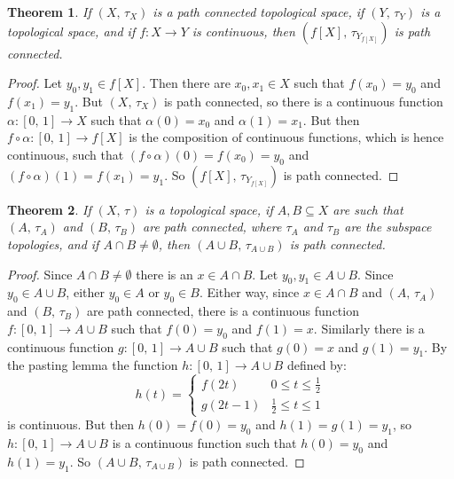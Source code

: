 \documentclass{article}
\theoremstyle{plain}
\newtheorem{theorem}{Theorem}[section]
\theoremstyle{normal}
\begin{document}
        \begin{theorem}
            If $(X,\,\tau_{X})$ is a path connected topological space,
            if $(Y,\,\tau_{Y})$ is a topological space, and if
            $f:X\rightarrow{Y}$ is continuous, then
            $(f[X],\,\tau_{Y_{f[X]}})$ is path connected.
        \end{theorem}
        \begin{proof}
            Let $y_{0},y_{1}\in{f}[X]$. Then there are
            $x_{0},x_{1}\in{X}$ such that $f(x_{0})=y_{0}$ and $f(x_{1})=y_{1}$.
            But $(X,\,\tau_{X})$ is path connected, so there is a continuous
            function $\alpha:[0,\,1]\rightarrow{X}$ such that
            $\alpha(0)=x_{0}$ and $\alpha(1)=x_{1}$. But then
            $f\circ\alpha:[0,\,1]\rightarrow{f}[X]$ is the composition of
            continuous functions, which is hence continuous, such that
            $(f\circ\alpha)(0)=f(x_{0})=y_{0}$ and
            $(f\circ\alpha)(1)=f(x_{1})=y_{1}$. So $(f[X],\,\tau_{Y_{f[X]}})$
            is path connected.
        \end{proof}
        \begin{theorem}
            If $(X,\,\tau)$ is a topological space, if
            $A,B\subseteq{X}$ are such that $(A,\,\tau_{A})$ and
            $(B,\,\tau_{B})$ are path connected, where $\tau_{A}$ and
            $\tau_{B}$ are the subspace topologies, and if
            $A\cap{B}\ne\emptyset$, then $(A\cup{B},\,\tau_{A\cup{B}})$ is
            path connected.
        \end{theorem}
        \begin{proof}
            Since $A\cap{B}\ne\emptyset$ there is an $x\in{A}\cap{B}$.
            Let $y_{0},y_{1}\in{A}\cup{B}$. Since $y_{0}\in{A}\cup{B}$, either
            $y_{0}\in{A}$ or $y_{0}\in{B}$. Either way, since $x\in{A}\cap{B}$
            and $(A,\,\tau_{A})$ and $(B,\,\tau_{B})$ are path connected,
            there is a continuous function $f:[0,\,1]\rightarrow{A}\cup{B}$
            such that $f(0)=y_{0}$ and $f(1)=x$. Similarly there is a
            continuous function $g:[0,\,1]\rightarrow{A}\cup{B}$ such that
            $g(0)=x$ and $g(1)=y_{1}$. By the pasting lemma the function
            $h:[0,\,1]\rightarrow{A}\cup{B}$ defined by:
            \begin{equation}
                h(t)=
                \begin{cases}
                    f(2t)&0\leq{t}\leq\frac{1}{2}\\
                    g(2t-1)&\frac{1}{2}\leq{t}\leq{1}
                \end{cases}
            \end{equation}
            is continuous. But then $h(0)=f(0)=y_{0}$ and $h(1)=g(1)=y_{1}$, so
            $h:[0,\,1]\rightarrow{A}\cup{B}$ is a continuous function such that
            $h(0)=y_{0}$ and $h(1)=y_{1}$. So
            $(A\cup{B},\,\tau_{A\cup{B}})$ is path connected.
        \end{proof}
\end{document}
